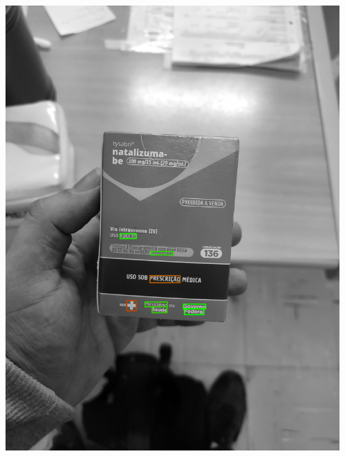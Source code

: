 \begin{frame}
\begin{columns}
\begin{column}{0.24\textwidth}
			\includegraphics[height=0.35\textheight]{../pictures/tysabri_rgb_g_only_boxes.jpg}
		\end{column}
		\begin{column}{0.24\textwidth}\centering

\end{column}
\end{columns}
\end{frame}
